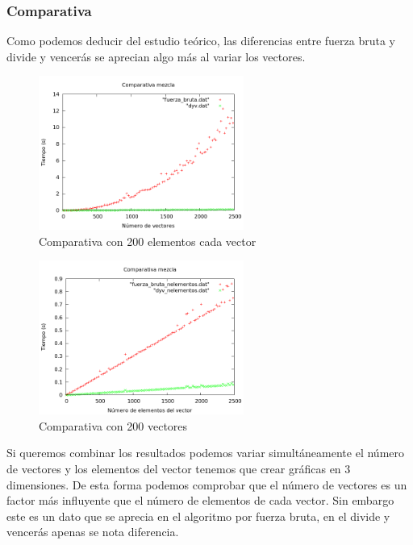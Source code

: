 \subsubsection{Comparativa}
Como podemos deducir del estudio te\'orico, las diferencias entre fuerza bruta y divide y vencer\'as se aprecian algo m\'as al variar los vectores.
\begin{figure}[htb] 
\centering
	\includegraphics[width=0.6\textwidth]{../Obligatorio/Graficas/comparativa_kvectores.png}
	\caption{Comparativa con 200 elementos cada vector} 
	\label{fig:comp_kvectores} 
\end{figure}

\begin{figure}[htb] 
\centering
	\includegraphics[width=0.6\textwidth]{../Obligatorio/Graficas/comparativa_nelementos.png}
	\caption{Comparativa con 200 vectores} 
	\label{fig:comp_nelementos} 
\end{figure}

\newpage
Si queremos combinar los resultados podemos variar simult\'aneamente el n\'umero de vectores y los elementos del vector tenemos que crear gr\'aficas en $3$ dimensiones.
De esta forma podemos comprobar que el n\'umero de vectores es un factor m\'as influyente que el n\'umero de elementos de cada vector. Sin embargo este es un dato que se aprecia en el algoritmo por fuerza bruta, en el divide y vencer\'as apenas se nota diferencia.


